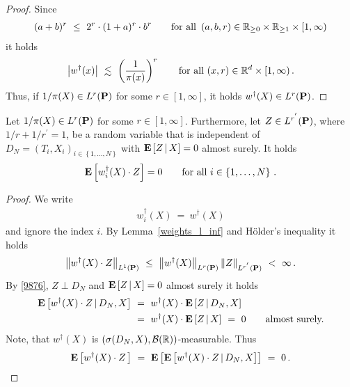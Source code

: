 \begin{proof}
  Since
  \begin{align*}
  (a+b)^r\
  \le \ 
  2^r\cdot (1+a)^r\cdot b^r
  \qquad
  \text{for all}\ 
  \left( a,b,r \right)
  \in
  \R_{\ge 0}\times\R_{\ge 1}\times [1,\infty)
  \end{align*}
 it holds
 \begin{align*}
   \left| w^\dagger(x) \right|
   \ 
   \lesssim
   \ 
   \left( 
     \frac{1}{\pi(x)}
   \right)^r
   \qquad
   \text{for all}\ 
   (x,r)\in\R^d\times [1,\infty)
   \,.
 \end{align*}
 Thus, if 
 $1/\pi(X)\in L^r(\P)$
 for some $r\in [1,\infty]$,
 it holds
 $w^\dagger(X)\in L^r(\P)$.
\end{proof}
\begin{lemma}
  \label{w.Z=0}
  Let 
 $1/\pi(X)\in L^r(\P)$
 for some $r\in [1,\infty]$.
 Furthermore, let 
 $Z\in L^{r^{'}}(\P)$,
 where
 $1/r + 1/r^{'}=1$,
  be a random variable that is independent of $D_N=(T_i,X_i)_{i\in \left\{
    1,\ldots,N
  \right\}}$ 
  with
  $
\E
\left[
  Z
  \,
  |
  \, 
  X
\right]
= 0
  $
  almost surely.
  It holds
  \begin{gather*}
  \E
  \left[
    w_i^\dagger(X)
  \cdot Z
  \right]
  =0
  \qquad
  \text{for all}
  \ 
  i\in \left\{ 1,\ldots,N \right\}
  \,.
  \end{gather*}
\end{lemma}
\begin{proof}
  We write
  \begin{gather*}
    w_i^\dagger(X)
  \ 
  =
  \ 
  w^\dagger(X)
  \end{gather*}
  and ignore the index $i$.
  By Lemma~\ref{weights_l_inf} and 
  Hölder's inequality it holds
  \begin{gather}
    \label{9876}
    \norm{
  w^\dagger(X)\cdot Z
    }_{L^1(\P)}
    \ 
  \le
    \ 
  \norm{w^\dagger(X)}_{L^r(\P)}
  \norm{Z}_{L^{r^{'}}(\P)}
  \ 
  <
  \ 
  \infty
  \,.
  \end{gather}
  By 
  \eqref{9876},
  $Z\perp D_N$
  and
  $
\E
\left[
  Z
  \,
  |
  \, 
  X
\right]
= 0
  $
  almost surely
  it holds 
  \begin{align*}
    \E
  \left[
  w^\dagger(X)
  \cdot
  Z
  \,
  |
  \,
  D_N,X
  \right]
  &
  \ 
  =
  \ 
  w^\dagger(X)
  \cdot
  \E
  \left[
  Z
  \,
  |
  \,
  D_N,X
  \right]
  \\
  &
  \ 
  =
  \ 
  w^\dagger(X)
  \cdot
  \E
  \left[
  Z
  \,
  |
  \,
  X
  \right]
  \
  =
  \ 
  0
  \qquad
  \text{almost surely.}
  \end{align*}
  Note, that $w^\dagger(X)$ is 
  $
  \left(
  \sigma(D_N,X),\mathcal{B}(\R)
  \right)
  $-measurable.  
  Thus
  \begin{gather*}
    \E
    \left[
  w^\dagger(X)
  \cdot
  Z
  \,
    \right]
    \ 
    =
    \ 
    \E
    \left[
 \E
  \left[
  w^\dagger(X)
  \cdot
  Z
  \,
  |
  \,
  D_N,X
  \right]
    \right]
    \ 
    =
    \ 
    0
    \,.
     \end{gather*}
\end{proof}

